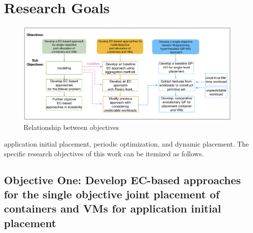\section{Research Goals}

\begin{figure}
	\centering
	\includegraphics[width=\textwidth]{pics/thesisPlan.png}
	\caption{Relationship between objectives}
	\label{fig:objectives}
\end{figure}
 application initial placement, periodic optimization, and dynamic placement. The specific research objectives of this work can be itemized as follows.

\subsection{Objective One: Develop EC-based approaches for the single objective joint placement of containers and VMs for application initial placement}
\label{sec:obj1}

